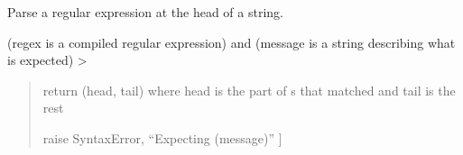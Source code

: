 \documentclass[letterpaper,10pt,english]{sphinxmanual}
\begin{document}

\begin{fulllineitems}
\label{\detokenize{api/killMS.Data:killMS.Data.sidereal.parseRe}}
\pysigstartsignatures
{}
\pysigstopsignatures
\sphinxAtStartPar
Parse a regular expression at the head of a string.
\begin{description}
\sphinxlineitem{{[} (s is a string) and}
\sphinxAtStartPar
(regex is a compiled regular expression) and
(message is a string describing what is expected) \sphinxhyphen{}\textgreater{}
\begin{quote}
\begin{description}
\sphinxAtStartPar
return (head, tail) where head is the part of s
that matched and tail is the rest

\sphinxAtStartPar
raise SyntaxError, “Expecting (message)” {]}

\end{description}
\end{quote}

\end{description}

\end{fulllineitems}

\end{document}
